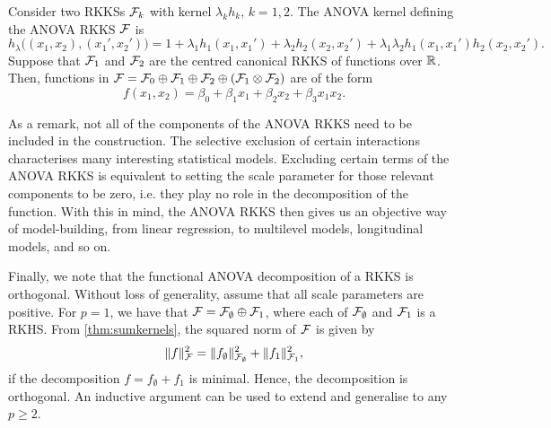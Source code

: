 
\begin{example}
  Consider two RKKSs ${\mathcal F}_k$ with kernel $\lambda_k h_k$, $k=1,2$.
  The ANOVA kernel defining the ANOVA RKKS ${\mathcal F}$ is
  \[
    h_\lambda\big((x_1,x_2),(x_1',x_2') \big) = 1 + \lambda_1 h_1(x_1,x_1') + \lambda_2 h_2(x_2,x_2') + \lambda_1\lambda_2 h_1(x_1,x_1')h_2(x_2,x_2').
  \]  
  Suppose that ${\mathcal F}_1$ and ${\mathcal F}_2$ are the centred canonical RKKS of functions over $\mathbb{R}$.
  Then, functions in ${\mathcal F} = {\mathcal F}_0 \oplus {\mathcal F}_1 \oplus {\mathcal F}_2 \oplus ({\mathcal F}_1 \otimes {\mathcal F}_2)$ are of the form
  \[
    f(x_1,x_2) = \beta_0 + \beta_1x_1 + \beta_2x_2 + \beta_3x_1x_2.
  \]
\end{example}

As a remark, not all of the components of the ANOVA RKKS need to be included in the construction.
The selective exclusion of certain interactions characterises many interesting statistical models.
Excluding certain terms of the ANOVA RKKS is equivalent to setting the scale parameter for those relevant components to be zero, i.e. they play no role in the decomposition of the function.
With this in mind, the ANOVA RKKS then gives us an objective way of model-building, from linear regression, to multilevel models, longitudinal models, and so on.

Finally, we note that the functional ANOVA decomposition of a RKKS is orthogonal.
Without loss of generality, assume that all scale parameters are positive.
For $p=1$, we have that ${\mathcal F} = {\mathcal F}_\emptyset \oplus {\mathcal F}_1$, where each of ${\mathcal F}_\emptyset$ and ${\mathcal F}_1$ is a RKHS.
From \cref{thm:sumkernels}, the squared norm of ${\mathcal F}$ is given by
\[
  \lVert f\rVert_{\mathcal F}^2 = \lVert f_\emptyset\rVert^2_{{\mathcal F}_\emptyset} + \lVert f_1\rVert^2_{{\mathcal F}_1},
\]
if the decomposition $f=f_\emptyset + f_1$ is minimal. 
Hence, the decomposition is orthogonal.
An inductive argument can be used to extend and generalise to any $p\geq 2$.

